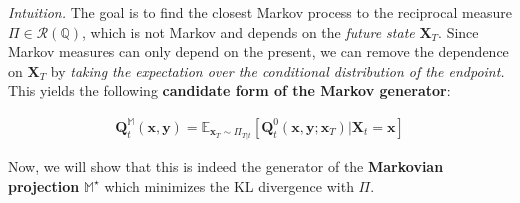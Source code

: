 \documentclass{article}
\begin{document}
\textit{Intuition.} The goal is to find the closest Markov process to the reciprocal measure $\Pi\in \mathcal{R}(\mathbb{Q})$, which is not Markov and depends on the \textit{future state} $\boldsymbol{X}_T$. Since Markov measures can only depend on the present, we can remove the dependence on $\boldsymbol{X}_T$ by \textit{taking the expectation over the conditional distribution of the endpoint.} This yields the following \textbf{candidate form of the Markov generator}:
\begin{small}
\begin{align}
    \boldsymbol{Q}^{\mathbb{M}}_t(\boldsymbol{x}, \boldsymbol{y})=\mathbb{E}_{\boldsymbol{x}_T\sim\Pi_{T|t}}\left[\boldsymbol{Q}_t^0(\boldsymbol{x}, \boldsymbol{y};\boldsymbol{x}_T)|\boldsymbol{X}_t=\boldsymbol{x}\right]\label{eq:markov-generator-candidate}
\end{align}
\end{small}
Now, we will show that this is indeed the generator of the \textbf{Markovian projection} $\mathbb{M}^\star$ which minimizes the KL divergence with $\Pi$.
\end{document}
